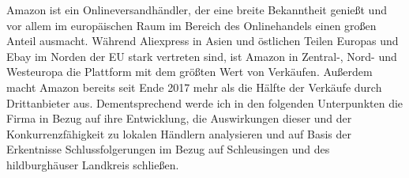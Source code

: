  Amazon ist ein Onlineversandhändler, der eine breite Bekanntheit genießt und vor allem im europäischen Raum im Bereich des Onlinehandels einen großen Anteil ausmacht. Während Aliexpress in Asien und östlichen Teilen Europas und Ebay im Norden der EU stark vertreten sind, ist Amazon in Zentral-, Nord- und Westeuropa die Plattform mit dem größten Wert von Verkäufen\cite[S. 22]{EuroCommerce}. Außerdem macht Amazon bereits seit Ende 2017 mehr als die Hälfte der Verkäufe durch Drittanbieter aus\cite[S. 25]{Haendlerbund}. Dementsprechend werde ich in den folgenden Unterpunkten die Firma in Bezug auf ihre Entwicklung, die Auswirkungen dieser und der Konkurrenzfähigkeit zu lokalen Händlern analysieren und auf Basis der Erkentnisse Schlussfolgerungen im Bezug auf Schleusingen und des hildburghäuser Landkreis schließen.
